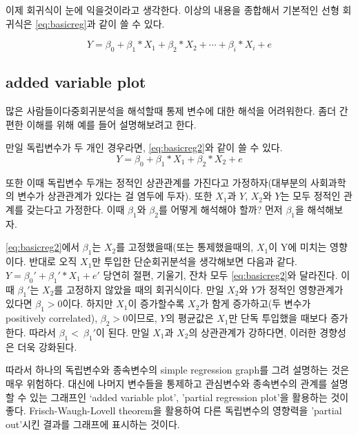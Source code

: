\documentclass[
]{book}
\begin{document}
이제 회귀식이 눈에 익을것이라고 생각한다. 이상의 내용을 종합해서 기본적인 선형 회귀식은 \eqref{eq:basicreg}과 같이 쓸 수 있다.

\begin{equation}
Y = \beta_{0}+\beta_{1}*X_{1}+\beta_{2}*X_{2}+\cdots+\beta_{i}*X_{i}+ e
\label{eq:basicreg}
\end{equation}

\subsection{added variable plot}\label{added-variable-plot}

많은 사람들이다중회귀분석을 해석할때 통제 변수에 대한 해석을 어려워한다. 좀더 간편한 이해를 위해 예를 들어 설명해보려고 한다.

만일 독립변수가 두 개인 경우라면, \eqref{eq:basicreg2}와 같이 쓸 수 있다.
\begin{equation}
Y = \beta_{0}+\beta_{1}*X_{1}+\beta_{2}*X_{2}+ e
\label{eq:basicreg2}
\end{equation}

또한 이때 독립변수 두개는 정적인 상관관계를 가진다고 가정하자(대부분의 사회과학의 변수가 상관관계가 있다는 걸 염두에 두자). 또한 \(X_{1}\)과 \(Y\), \(X_{2}\)와 \(Y\)는 모두 정적인 관계를 갖는다고 가정한다. 이때 \(\beta_{1}\)와 \(\beta_{2}\)를 어떻게 해석해야 할까? 먼저 \(\beta_{1}\)을 해석해보자.

\eqref{eq:basicreg2}에서 \(\beta_{1}\)는 \(X_{2}\)를 고정했을때(또는 통제했을때의, \(X_{1}\)이 Y에 미치는 영향이다.
반대로 오직 \(X_{1}\)만 투입한 단순회귀분석을 생각해보면 다음과 같다.
\(Y = {\beta_{0}}'+{\beta_{1}}'*X_{1}+{e}'\)
당연히 절편, 기울기, 잔차 모두 \eqref{eq:basicreg2}와 달라진다. 이때 \({\beta_{1}}'\)는 \(X_{2}\)를 고정하지 않았을 때의 회귀식이다.
만일 \(X_{2}\)와 \(Y\)가 정적인 영향관계가 있다면 \(\beta_{1}>0\)이다. 하지만 \(X_{1}\)이 증가할수록 \(X_{2}\)가 함게 증가하고(두 변수가 positively correlated), \(\beta_{2}>0\)이므로, \(Y\)의 평균값은 \(X_{1}\)만 단독 투입했을 때보다 증가한다. 따라서 \(\beta_{1}<\ {\beta_{1}}'\)이 된다. 만일 \(X_{1}\)과 \(X_{2}\)의 상관관계가 강하다면, 이러한 경향성은 더욱 강화된다.

따라서 하나의 독립변수와 종속변수의 simple regression graph를 그려 설명하는 것은 매우 위험하다. 대신에 나머지 변수들을 통제하고 관심변수와 종속변수의 관계를 설명할 수 있는 그래프인 `added variable plot', 'partial regression plot'을 활용하는 것이 좋다. Frisch-Waugh-Lovell theorem을 활용하여 다른 독립변수의 영향력을 'partial out'시킨 결과를 그래프에 표시하는 것이다.
\end{document}
